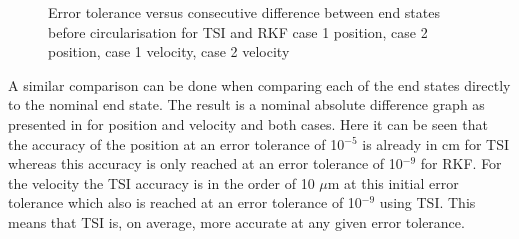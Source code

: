 \begin{figure}[H]
\caption{Error tolerance versus consecutive difference between end states before circularisation for \ac{TSI} and \ac{RKF} \protect{} case 1 position, \protect{} case 2 position, \protect{} case 1 velocity, \protect{} case 2 velocity } 
\label{fig:errorToleranceVsConsecutiveDifferenceCase1RKFTSIpositionSmall} 
\end{figure} 

A similar comparison can be done when comparing each of the end states directly to the nominal end state. The result is a nominal absolute difference graph as presented in  for position and velocity and both cases. Here it can be seen that the accuracy of the position at an error tolerance of 10$^{-5}$ is already in cm for \ac{TSI} whereas this accuracy is only reached at an error tolerance of 10$^{-9}$ for \ac{RKF}. For the velocity the \ac{TSI} accuracy is in the order of 10 $\mu$m at this initial error tolerance which also is reached at an error tolerance of 10$^{-9}$ using \ac{TSI}. This means that \ac{TSI} is, on average, more accurate at any given error tolerance.  


